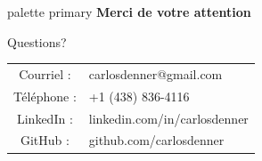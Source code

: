 \documentclass[aspectratio=169,11pt]{beamer}
\begin{document}
\begin{frame}{}
  \begin{beamercolorbox}[wd=\paperwidth,ht=1.8cm,dp=0.3cm,center]{palette primary}
    {\large\bfseries Merci de votre attention}
  \end{beamercolorbox}
  
  \vspace{1cm}
  
  \centering
  {\Huge{}}
  
  \vspace{0.8em}
  
  {\Large Questions?}
  
  \vspace{1em}
  
  \begin{tabular}{cl}
    Courriel : & carlosdenner@gmail.com \\
    Téléphone : & +1 (438) 836-4116 \\
    LinkedIn : & linkedin.com/in/carlosdenner \\
    GitHub : & github.com/carlosdenner \\
  \end{tabular}
\end{frame}
\end{document}
